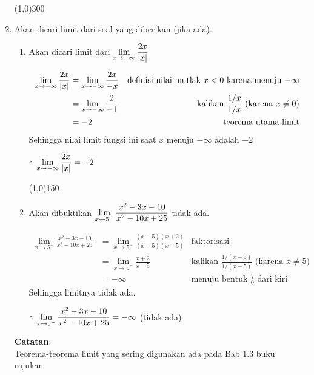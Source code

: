 \begin{enumerate}[leftmargin=*, label={\arabic*}.]
\begin{center}\line(1,0){300}\end{center}


\item Akan dicari limit dari soal yang diberikan (jika ada).
    \begin{enumerate}[label={\alph*}.]
    \item Akan dicari limit dari $\displaystyle \lim_{x\to -\infty} \frac{2x}{\lvert x\rvert}$
    
    \begin{align*}
        \lim_{x\to -\infty} \frac{2x}{\lvert x\rvert} 
        &= \lim_{x\to -\infty} \frac{2x}{-x}
        &\text{definisi nilai mutlak $x < 0$ karena menuju $-\infty$}\\
        &= \lim_{x\to -\infty} \frac{2}{-1}
        &\text{kalikan $\frac{1/x}{1/x}$ (karena $x \neq 0$)}\\
        &= -2
        &\text{teorema utama limit}
    \end{align*}
    Sehingga nilai limit fungsi ini saat $x$ menuju $-\infty$ adalah $-2$

    $\therefore$ $\displaystyle \lim_{x\to -\infty} \frac{2x}{\lvert x\rvert} = -2$

    \begin{center}\line(1,0){150}\end{center}

    \item Akan dibuktikan 
    $\displaystyle \lim_{x\to 5^{-}} \frac{x^{2}-3x-10}{x^{2}-10x+25}$ tidak ada.

    \begin{align*}
        \lim_{x\to 5^{-}} \frac{x^{2}-3x-10}{x^{2}-10x+25} 
        &= \lim_{x\to 5^{-}} \frac{(x-5)(x+2)}{(x-5)(x-5)}
        &\text{faktorisasi}\\
        &= \lim_{x\to 5^{-}} \frac{x+2}{x-5}
        &\text{kalikan $\frac{1/(x-5)}{1/(x-5)}$ (karena $x \neq 5$)}\\
        &= -\infty
        &\text{menuju bentuk $\frac{7}{0}$ dari kiri}
    \end{align*}
    Sehingga limitnya tidak ada.

    $\therefore$
    $\displaystyle \lim_{x\to 5^{-}} \frac{x^{2}-3x-10}{x^{2}-10x+25} = -\infty$ 
    (tidak ada)
\end{enumerate}

\vspace{0.1cm}
\textbf{Catatan}:\\
Teorema-teorema limit yang sering digunakan ada pada Bab 1.3 buku rujukan 
\cite{valberg}



\end{enumerate}
